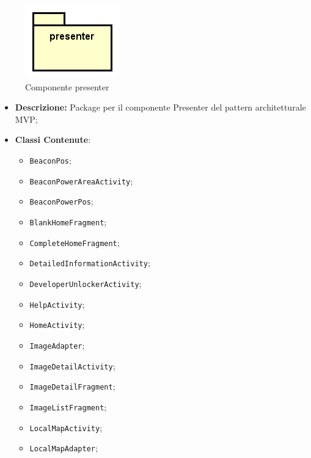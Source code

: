 \documentclass[../DefinizioneDiProdotto.tex]{subfiles}
\begin{document}
\begin{figure}[H]
	\centering
	\includegraphics[width=\maxwidth]{img/package/presenter.png}
	\caption{Componente presenter}\label{fig:presenter} 
\end{figure}
\begin{itemize}
	\item \textbf{Descrizione:} Package per il componente Presenter del pattern architetturale MVP;
	\item \textbf{Classi Contenute}:
	\begin{itemize}
		\item \texttt{BeaconPos};
		
		\item \texttt{BeaconPowerAreaActivity};
		
		\item \texttt{BeaconPowerPos};
		
		\item \texttt{BlankHomeFragment};
		
		\item \texttt{CompleteHomeFragment};
		
		\item \texttt{DetailedInformationActivity};
		
		\item \texttt{DeveloperUnlockerActivity};
		
		\item \texttt{HelpActivity};
		
		\item \texttt{HomeActivity};
		
		\item \texttt{ImageAdapter};
		
		\item \texttt{ImageDetailActivity};
		
		\item \texttt{ImageDetailFragment};
		
		\item \texttt{ImageListFragment};
		
		\item \texttt{LocalMapActivity};
		
		\item \texttt{LocalMapAdapter};
		

\end{itemize}
\end{itemize}
\end{document}
